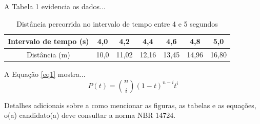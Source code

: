 A Tabela 1 evidencia os dados...

\begin{table}[h]
	\centering
	\caption{Distância percorrida no intervalo 	de tempo entre 4 e 5 segundos}
	\begin{tabular}{c|c|c|c|c|c|c}
	\hline
	Intervalo de tempo (s) & 4,0 & 4,2 & 4,4  & 4,6 & 4,8 & 5,0 \\ \hline
	Distância (m) & 10,0 & 11,02 & 12,16  & 	13,45 & 14,96 & 16,80 \\  \hline  %
	\end{tabular}
	\vspace{-10pt}
\end{table}

A Equação \ref{eq1} mostra...%
\begin{equation}\label{eq1}
P(t)={n \choose i}(1-t)^{n-i} t^i
\end{equation}


Detalhes adicionais sobre a como mencionar as figuras, as tabelas e as equações, o(a) candidato(a) deve consultar a norma NBR 14724.

